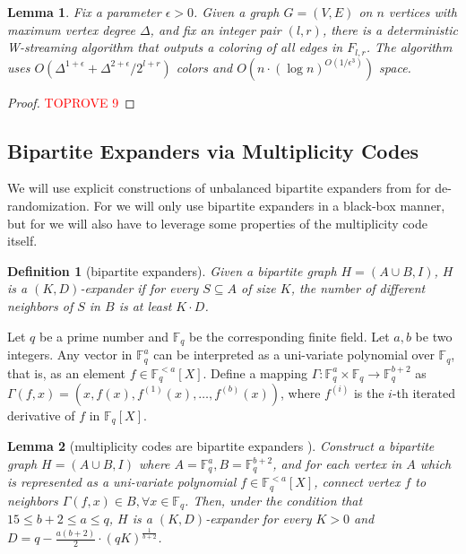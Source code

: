 \documentclass[11pt,a4paper]{article}
\newtheorem{lemma}{Lemma}[section]
\newtheorem{definition}{Definition}[section]
\newcommand{\brac}[1]{\left(#1\right)}
\newcommand{\field}{\mathbb{F}}
\begin{document}
\begin{lemma}\label{det-high}
	Fix a parameter $\epsilon > 0$. Given a graph $G = (V, E)$ on $n$ vertices with maximum vertex degree $\Delta$, and fix an integer pair $(l, r)$, there is a deterministic W-streaming algorithm that outputs a coloring of all edges in $F_{l, r}$. The algorithm uses $O\brac{\Delta^{1+\epsilon} + \Delta^{2+\epsilon} / 2^{l+r}}$ colors and $O\brac{n \cdot (\log n)^{{O(1/\epsilon^3)}}}$ space.
\end{lemma}

\begin{proof}\textcolor{red}{TOPROVE 9}\end{proof}

\subsection{Bipartite Expanders via Multiplicity Codes}
We will use explicit constructions of unbalanced bipartite expanders from \cite{kalev2022unbalanced} for de-randomization. For  we will only use bipartite expanders in a black-box manner, but for  we will also have to leverage some properties of the multiplicity code itself. 

\begin{definition}[bipartite expanders]
	Given a bipartite graph $H = (A\cup B, I)$, $H$ is a $(K, D)$-expander if for every $S\subseteq A$ of size $K$, the number of different neighbors of $S$ in $B$ is at least $K\cdot D$.
\end{definition}

Let $q$ be a prime number and $\field_q$ be the corresponding finite field. Let $a, b$ be two integers. Any vector in $\field_q^a$ can be interpreted as a uni-variate polynomial over $\field_q$, that is, as an element $f\in \field_q^{<a}[X]$. Define a mapping $\Gamma: \field_q^a\times \field_q\rightarrow \field_q^{b+2}$ as $\Gamma(f, x) = \left(x, f(x), f^{(1)}(x), \ldots, f^{(b)}(x)\right)$, where $f^{(i)}$ is the $i$-th iterated derivative of $f$ in $\field_q[X]$. 

\begin{lemma}[multiplicity codes are bipartite expanders \cite{kalev2022unbalanced}]\label{multi}
	Construct a bipartite graph $H = (A\cup B, I)$ where $A = \field_q^a, B = \field_q^{b+2}$, and for each vertex in $A$ which is represented as a uni-variate polynomial $f\in \field_q^{<a}[X]$, connect vertex $f$ to neighbors $\Gamma(f, x)\in B, \forall x\in \field_q$. Then, under the condition that $15\leq b+2\leq a\leq q$, $H$ is a $(K, D)$-expander for every $K>0$ and $D = q - \frac{a(b+2)}{2}\cdot (qK)^{\frac{1}{b+2}}$.
\end{lemma}
\end{document}
